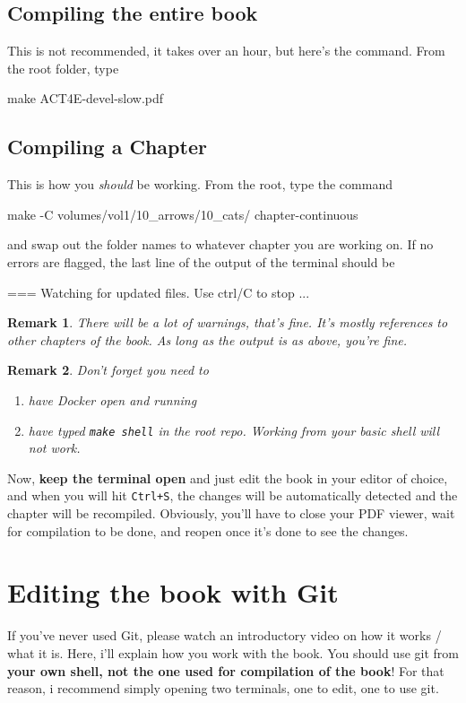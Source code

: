 \documentclass{article}
\newtheorem{remark}{Remark}
\begin{document}
\subsection{Compiling the entire book}
This is not recommended, it takes over an hour, but here's the command. From the root folder, type
\begin{bashcode}
    make ACT4E-devel-slow.pdf
\end{bashcode}
\subsection{Compiling a Chapter}
This is how you \textit{should} be working. From the root, type the command
\begin{bashcode}
    make -C volumes/vol1/10_arrows/10_cats/ chapter-continuous
\end{bashcode}
and swap out the folder names to whatever chapter you are working on. If no errors are flagged, the last line of the output of the terminal should be 
\begin{bashcode}
    === Watching for updated files. Use ctrl/C to stop ...
\end{bashcode}
\begin{remark}
    There will be a lot of warnings, that's fine. It's mostly references to other chapters of the book. As long as the output is as above, you're fine.
\end{remark}
\begin{remark}
    Don't forget you need to 
    \begin{enumerate}
        \item have Docker open and running
        \item have typed \texttt{make shell} in the root repo. Working from your basic shell will not work.
    \end{enumerate}
\end{remark}
Now, \textbf{keep the terminal open} and just edit the book in your editor of choice, and when you will hit \texttt{Ctrl+S}, the changes will be automatically detected and the chapter will be recompiled. Obviously, you'll have to close your PDF viewer, wait for compilation to be done, and reopen once it's done to see the changes. 

\section{Editing the book with Git}
If you've never used Git, please watch an introductory video on how it works / what it is. Here, i'll explain how you work with the book. You should use git from \textbf{your own shell, not the one used for compilation of the book}! For that reason, i recommend simply opening two terminals, one to edit, one to use git.
\end{document}
